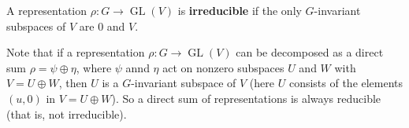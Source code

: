 



\begin{definition}
A representation $\rho: G \to \operatorname{GL}(V)$ is \textbf{irreducible} if the only $G$-invariant subspaces of $V$ are $0$ and $V$. 
\end{definition}

Note that if a representation $\rho : G \to \operatorname{GL}(V)$ can be decomposed as a direct sum $\rho = \psi \oplus \eta$, where $\psi$ annd $\eta$ act on nonzero subspaces $U$ and $W$ with $V = U \oplus W$, then $U$ is a $G$-invariant subspace of $V$ (here $U$ consists of the elements $(u, 0)$ in $V = U \oplus W$). So a direct sum of representations is always reducible (that is, not irreducible). 





